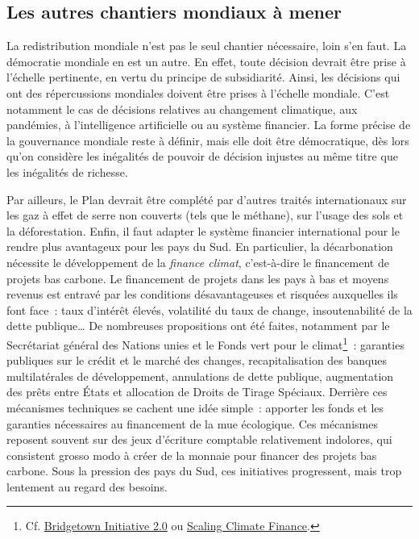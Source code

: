 \documentclass[a5paper,french,openany]{memoir}
\begin{document}
\subsection{Les autres chantiers mondiaux à mener}
La redistribution mondiale n'est pas le seul chantier nécessaire, loin s'en faut. La démocratie mondiale en est un autre. %
En effet, toute décision devrait être prise à l'échelle pertinente, en vertu du principe de subsidiarité. Ainsi, les décisions qui ont des répercussions mondiales doivent être prises à l'échelle mondiale. %
C'est notamment le cas de décisions relatives au changement climatique, aux pandémies, à l'intelligence artificielle ou au système financier. %
La forme précise de la gouvernance mondiale reste à définir, mais elle doit être démocratique, dès lors qu'on considère les inégalités de pouvoir de décision injustes au même titre que les inégalités de richesse. %

Par ailleurs, le Plan devrait être complété par d'autres traités internationaux sur les gaz à effet de serre non couverts (tels que le méthane), sur l'usage des sols et la déforestation. 
Enfin, il faut adapter le système financier international pour le rendre plus avantageux pour les pays du Sud. En particulier, la décarbonation nécessite le développement de la \textit{finance climat}, c'est-à-dire le financement de projets bas carbone. Le financement de projets dans les pays à bas et moyens revenus est entravé par les conditions désavantageuses et risquées auxquelles ils font face~: taux d'intérêt élevés, volatilité du taux de change, insoutenabilité de la dette publique\dots{} De nombreuses propositions ont été faites, notamment par le Secrétariat général des Nations unies et le Fonds vert pour le climat\footnote{Cf. \href{https://www.un.org/sustainabledevelopment/blog/2023/04/press-release-with-clock-ticking-for-the-sdgs-un-chief-and-barbados-prime-minister-call-for-urgent-action-to-transform-broken-global-financial-system/}{Bridgetown Initiative 2.0} ou \href{https://www.greenclimate.fund/sites/default/files/document/scaling-climate-finance-context-covid-19-full-report\_0.pdf}{Scaling Climate Finance}.}~: garanties publiques sur le crédit et le marché des changes, recapitalisation des banques multilatérales de développement, annulations de dette publique, augmentation des prêts entre États et allocation de Droits de Tirage Spéciaux. Derrière ces mécanismes techniques se cachent une idée simple~: apporter les fonds et les garanties nécessaires au financement de la mue écologique. Ces mécanismes reposent souvent sur des jeux d'écriture comptable relativement indolores, qui consistent grosso modo à créer de la monnaie pour financer des projets bas carbone. Sous la pression des pays du Sud, ces initiatives progressent, mais trop lentement au regard des besoins.
\end{document}
